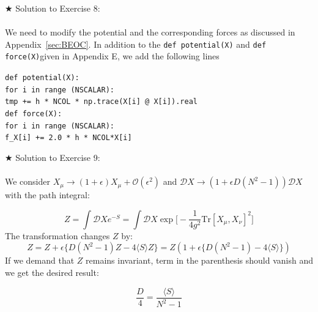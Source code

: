\documentclass[letter,11pt]{article}
\newcommand\tab[1][1cm]{\hspace*{#1}}
\begin{document}
\noindent $\bigstar$ Solution to Exercise 8:
\\  \\ 
We need to modify the potential and the corresponding forces as discussed in Appendix~\ref{sec:BEOC}. In addition to the \verb"def potential(X)" 
and \verb"def force(X)"given in Appendix E, we add the following lines 

\begin{footnotesize} 

\begin{mdframed}[backgroundcolor=blue!3] 
 \verb"def potential(X):" \\
 \tab	\verb"for i in range (NSCALAR):" \\ 
    \tab     \tab	\verb"tmp += h * NCOL * np.trace(X[i] @ X[i]).real" \\
    
\vspace{5mm} 
\noindent
\verb"def force(X):" \\ 
\tab	\verb"for i in range (NSCALAR):"  \\ 
       \tab  \tab 	\verb"f_X[i] += 2.0 * h * NCOL*X[i] " 
\end{mdframed}
\end{footnotesize} 

\noindent $\bigstar$ Solution to Exercise 9: 
\\ \\ 
We consider $ X_{\mu} \to (1 + \epsilon) X_{\mu} + \mathcal{O}(\epsilon^2)$
and $\mathcal{D}X \to (1 + \epsilon D (N^2-1))\mathcal{D}X$ with the path integral:

\begin{equation}
	Z = \int \mathcal{D}X e^{-S} = \int \mathcal{D}X \exp\Big[-\frac{1}{4g^2} \mbox{Tr} [X_\mu,X_\nu]^2\Big]
\end{equation}
The transformation changes $Z$ by:
\begin{equation}
	Z = Z + \epsilon \Big\{ D(N^2 -1)Z - 4\langle S \rangle Z  \Big\} = Z ( 1 + \epsilon \Big\{ D(N^2 -1) - 4\langle S \rangle   \Big\})
\end{equation}
If we demand that $Z$ remains invariant, term in the parenthesis should vanish and we get the desired result:

\begin{equation}
	\frac{D}{4} = \frac{\langle S \rangle}{N^2 - 1 }
\end{equation}  
           
\end{document}
